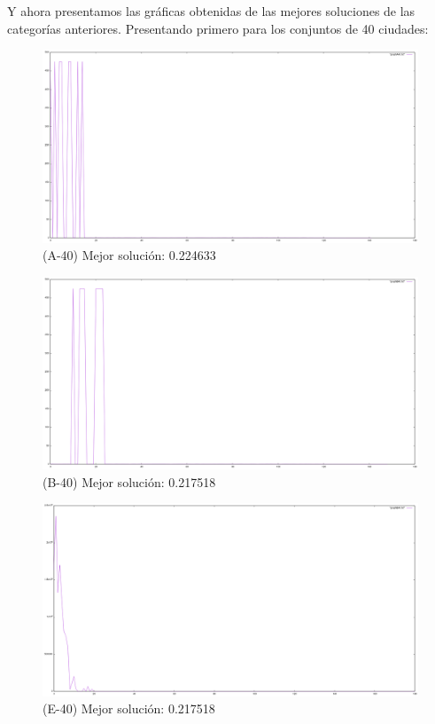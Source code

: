 \documentclass{article}
\begin{document}
  Y ahora presentamos las gráficas obtenidas 
  de las mejores soluciones de las categorías 
  anteriores. Presentando primero para los 
  conjuntos de 40 ciudades:

  \begin{figure}[!h]
    \includegraphics[scale=0.35]{A40}
    \caption{(A-40) Mejor solución: 0.224633} 
  \end{figure}
  \begin{figure}[!h]
    \includegraphics[scale=0.35]{B40}
    \caption{(B-40) Mejor solución: 0.217518} 
  \end{figure}
  \begin{figure}[!h]
    \includegraphics[scale=0.35]{E40}
    \caption{(E-40) Mejor solución: 0.217518} 
  \end{figure}
\end{document}
